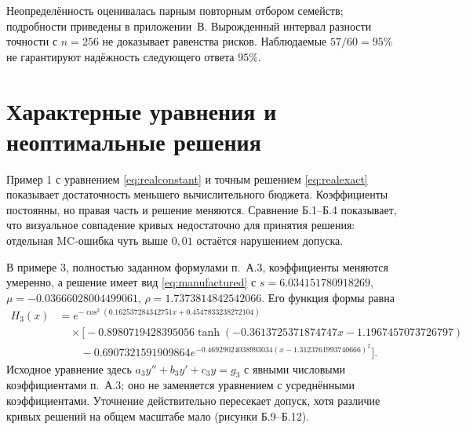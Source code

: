 Неопределённость оценивалась парным повторным отбором семейств; подробности приведены в приложении~В. Вырожденный интервал разности точности с $n=256$ не доказывает равенства рисков. Наблюдаемые $57/60=95\%$ не гарантируют надёжность следующего ответа $95\%$.


\clearpage
{}
\section{Характерные уравнения и неоптимальные решения}
Пример 1 с уравнением \eqref{eq:realconstant} и точным решением \eqref{eq:realexact} показывает достаточность меньшего вычислительного бюджета. Коэффициенты постоянны, но правая часть и решение меняются. Сравнение Б.1--Б.4 показывает, что визуальное совпадение кривых недостаточно для принятия решения: отдельная MC-ошибка чуть выше $0{,}01$ остаётся нарушением допуска.

В примере 3, полностью заданном формулами п.~А.3, коэффициенты меняются умеренно, а решение имеет вид \eqref{eq:manufactured} с $s=6.034151780918269$, $\mu=-0.03666028004499061$, $\rho=1.7373814842542066$. Его функция формы равна
\begin{equation}\label{eq:example3shape}
\begin{aligned}
H_3(x)&=e^{-\cos^2(0.162537284342751x+0.4547833238272104)}\\
&\quad\times\bigl[-0.8980719428395056\tanh(-0.3613725371874747x-1.1967457073726797)\\
&\qquad-0.6907321591909864e^{-0.46929024038993034(x-1.3123761993740666)^2}\bigr].
\end{aligned}
\end{equation}
Исходное уравнение здесь $a_3y''+b_3y'+c_3y=g_3$ с явными числовыми коэффициентами п.~А.3; оно не заменяется уравнением с усреднёнными коэффициентами. Уточнение действительно пересекает допуск, хотя различие кривых решений на общем масштабе мало (рисунки Б.9--Б.12).

